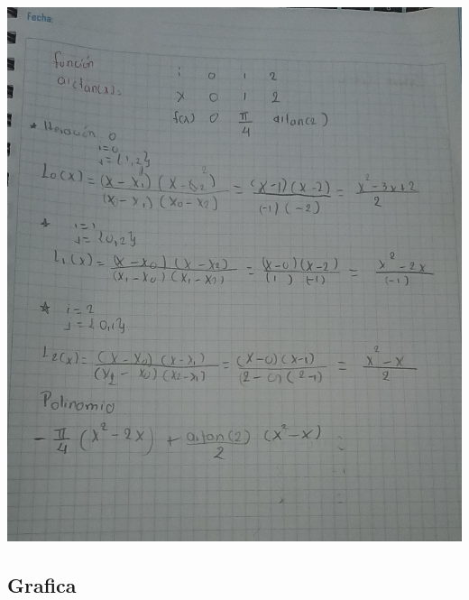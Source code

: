 \documentclass[
  letterpaper,
  DIV=11,
  numbers=noendperiod]{scrartcl}
\begin{document}
\includegraphics{EJER2V.jpeg}

\subsection{Grafica}\label{grafica}
\end{document}

